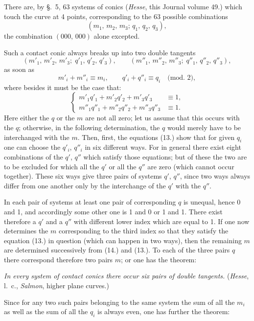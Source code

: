 \documentclass{article}
\begin{document}

There are, by §.~5, 63 systems of conics (\emph{Hesse}, this Journal volume 49.) which touch the curve at 4 points, corresponding to the 63 possible combinations
\[
(m_{1},\, m_{2},\, m_{3};\, q_{1},\, q_{2},\, q_{3}),
\]
the combination $(000,\, 000)$ alone excepted.

Such a contact conic always breaks up into two double tangents
\[
(m'_{1},\, m'_{2},\, m'_{3};\; q'_{1},\, q'_{2},\, q'_{3}), \qquad (m''_{1},\, m''_{2},\, m''_{3};\; q''_{1},\, q''_{2},\, q''_{3}),
\]
as soon as
\[
m'_{i}+m''_{i} \equiv m_{i}, \qquad q'_{i}+q''_{i} \equiv q_{i} \quad \text{(mod.\ 2)}, \tag{13.}
\]
where besides it must be the case that:
\[
\left\{
\begin{aligned}
m'_{1}q'_{1}+m'_{2}q'_{2}+m'_{3}q'_{3} &\equiv 1,\\
m''_{1}q''_{1}+m''_{2}q''_{2}+m''_{3}q''_{3} &\equiv 1.
\end{aligned}
\right. \tag{14.}
\]
Here either the $q$ or the $m$ are not all zero; let us assume that this occurs with the $q$; otherwise, in the following determination, the $q$ would merely have to be interchanged with the $m$. Then, first, the equations (13.) show that for given $q_{i}$ one can choose the $q'_{i}$, $q''_{i}$ in six different ways. For in general there exist eight combinations of the $q'$, $q''$ which satisfy those equations; but of these the two are to be excluded for which all the $q'$ or all the $q''$ are zero (which cannot occur together). These six ways give three pairs of systems $q'$, $q''$, since two ways always differ from one another only by the interchange of the $q'$ with the $q''$.

In each pair of systems at least one pair of corresponding $q$ is unequal, hence 0 and 1, and accordingly some other one is 1 and 0 or 1 and 1. There exist therefore a $q'$ and a $q''$ with different lower index which are equal to 1. If one now determines the $m$ corresponding to the third index so that they satisfy the equation (13.) in question (which can happen in two ways), then the remaining $m$ are determined successively from (14.) and (13.). To each of the three pairs $q$ there correspond therefore two pairs $m$; or one has the theorem:

\emph{In every system of contact conics there occur six pairs of double tangents.} (\emph{Hesse}, l.\ c., \emph{Salmon}, higher plane curves.)

Since for any two such pairs belonging to the same system the sum of all the $m_{i}$ as well as the sum of all the $q_{i}$ is always even, one has further the theorem:
\end{document}
